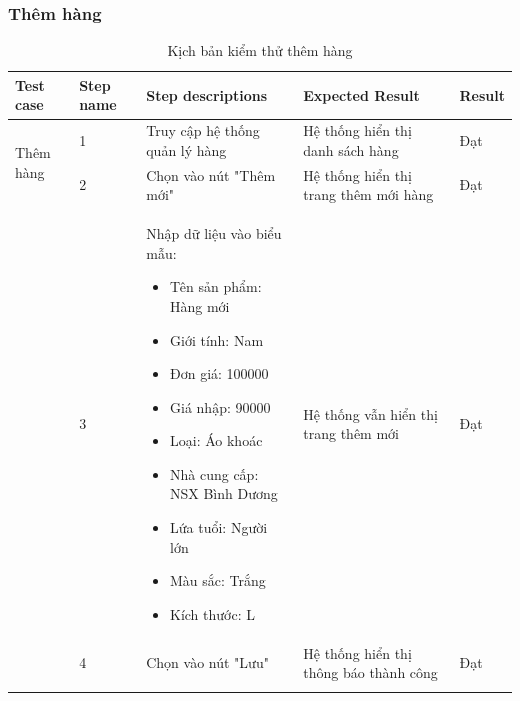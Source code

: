 \subsubsection{Thêm hàng}
{
    \setlength\extrarowheight{6pt}
    \begin{longtable}{| p{2.5cm}| p{1cm}| p{5.5cm}| p{4.5cm} | p{1.5cm} |}
        \hline
        \textbf{Test case}                 & \textbf{Step name}                   & \textbf{Step descriptions}     & \textbf{Expected Result}               & \textbf{Result} \\
        \hline
        \multirow[t]{2}{2.5cm}{Thêm hàng}  & 1                                    & Truy cập hệ thống quản lý hàng & Hệ thống hiển thị danh sách hàng       & Đạt             \\
        \cline{2-5}
                                           & 2                                    & Chọn vào nút "Thêm mới"        & Hệ thống hiển thị trang thêm mới hàng  & Đạt             \\
        \cline{2-5}
                                           & 3                                    & Nhập dữ liệu vào biểu mẫu:
        \begin{itemize}
            \item Tên sản phẩm: Hàng mới
            \item Giới tính: Nam
            \item Đơn giá: 100000
            \item Giá nhập: 90000
            \item Loại: Áo khoác
            \item Nhà cung cấp: NSX Bình Dương
            \item Lứa tuổi: Người lớn
            \item Màu sắc: Trắng
            \item Kích thước: L
        \end{itemize} & Hệ thống vẫn hiển thị trang thêm mới & Đạt                                                                                                            \\
        \cline{2-5}
                                           & 4                                    & Chọn vào nút "Lưu"             & Hệ thống hiển thị thông báo thành công & Đạt             \\
        \hline
        \caption{Kịch bản kiểm thử thêm hàng}
    \end{longtable}
}


